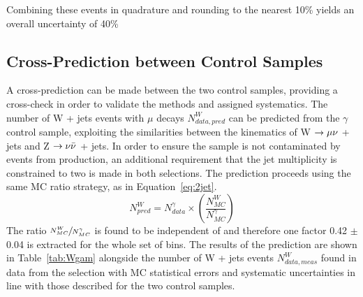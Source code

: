 Combining these events in quadrature and rounding to the nearest 10\% yields an overall uncertainty of 40\%
\subsection{Cross-Prediction between Control Samples}
A cross-prediction can be made between the two control samples, providing a cross-check in order to validate the methods and assigned systematics. The number of W + jets events with $\mu$ decays $N^{W}_{data, pred}$ can be predicted from the $\gamma$ control sample, exploiting the similarities between the kinematics of W $\rightarrow \mu \nu$ + jets and Z $\rightarrow \nu \bar{\nu}$ + jets. In order to ensure the sample is not contaminated by events from \tto production, an additional requirement that the jet multiplicity is constrained to two is made in both selections. The prediction proceeds using the same MC ratio strategy, as in Equation~\ref{eq:2jet}.
\begin{equation}
N^{W}_{pred} = N^{\gamma}_{data} \times (\frac{N^{W}_{MC}}{N^{\gamma}_{MC}})
\label{eq:2jet}
\end{equation} 
The ratio $\sfrac{N^{W}_{MC}}{N^{\gamma}_{MC}}$ is found to be independent of \HT and therefore one factor 0.42 $\pm$ 0.04 is extracted for the whole set of bins. The results of the prediction are shown in Table~\ref{tab:Wgam} alongside the number of W + jets events $N^{W}_{data, meas}$ found in data from the selection with MC statistical errors and systematic uncertainties in line with those described for the two control samples. 

